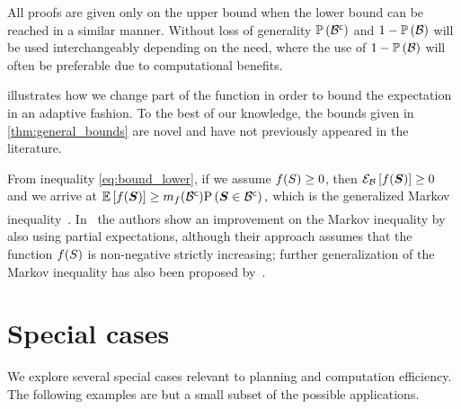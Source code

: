 All proofs are given only on the upper bound when the lower bound can be reached in a similar manner. Without loss of generality $\mathbb{P}\left({{\mathcal B}^{\mathsf{c}}}\right)$ and $1-\mathbb{P}\left({\mathcal B}\right)$ will be used interchangeably depending on the need, where the use of $1-\mathbb{P}\left({\mathcal B}\right)$ will often be preferable due to computational benefits.


 illustrates how we change part of the function in order to bound the expectation in an adaptive fashion. To the best of our knowledge, the bounds given in \cref{thm:general_bounds} are novel and have not previously appeared in the literature.

From inequality \eqref{eq:bound_lower}, if we assume $f(S)\geq0$, then $\mathcal{E}_{\mathcal B}\left[{f(\boldsymbol S)}\right]\geq0$ and we arrive at $\operatorname*{\mathbb{E}}\limits_{}\left[{f(\boldsymbol S)}\right]\geq m_f({\mathcal B}^{\mathsf{c}})\mathrm{P}\left({\boldsymbol S\in{\ensuremath{\mathcal B}}^{\mathsf{c}}}\right),$ which is the generalized Markov inequality~\cite{Durrett19book}. In~\cite{Ogasawara21} the authors show an improvement on the Markov inequality by also using partial expectations, although their approach assumes that the function $f(S)$ is non-negative strictly increasing; further generalization of the Markov inequality has also been proposed by~\cite{Bhat22spl}.


\section{Special cases}
We explore several special cases relevant to planning and computation efficiency. The following examples are but a small subset of the possible applications.

